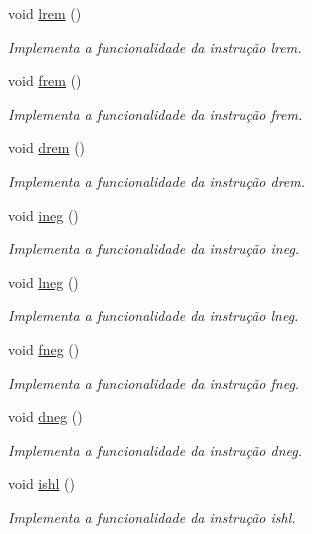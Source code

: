 \begin{DoxyCompactItemize}
void \hyperlink{classOperations_a437e4b34f2f1be8982d36f0cdf47f98c}{lrem} ()
\begin{DoxyCompactList}\small\item\em Implementa a funcionalidade da instrução lrem. \end{DoxyCompactList}\item 
void \hyperlink{classOperations_ad29eac4f222e4b74667086c3da0d5538}{frem} ()
\begin{DoxyCompactList}\small\item\em Implementa a funcionalidade da instrução frem. \end{DoxyCompactList}\item 
void \hyperlink{classOperations_abe333415749dbd2331ce89dc5e2233c5}{drem} ()
\begin{DoxyCompactList}\small\item\em Implementa a funcionalidade da instrução drem. \end{DoxyCompactList}\item 
void \hyperlink{classOperations_a819d5dd66c64a6801a1599b5abf81ae7}{ineg} ()
\begin{DoxyCompactList}\small\item\em Implementa a funcionalidade da instrução ineg. \end{DoxyCompactList}\item 
void \hyperlink{classOperations_a0a14cc7ee880b5d5f1c3b532e8e2117c}{lneg} ()
\begin{DoxyCompactList}\small\item\em Implementa a funcionalidade da instrução lneg. \end{DoxyCompactList}\item 
void \hyperlink{classOperations_a17a7d8f333373d30ae5b1595d96594e5}{fneg} ()
\begin{DoxyCompactList}\small\item\em Implementa a funcionalidade da instrução fneg. \end{DoxyCompactList}\item 
void \hyperlink{classOperations_a04f5d4f85b80f4c04216cd0259d3d7dc}{dneg} ()
\begin{DoxyCompactList}\small\item\em Implementa a funcionalidade da instrução dneg. \end{DoxyCompactList}\item 
void \hyperlink{classOperations_a3139bbe41519fb4761ecd7e2a8ddb994}{ishl} ()
\begin{DoxyCompactList}\small\item\em Implementa a funcionalidade da instrução ishl. \end{DoxyCompactList}\item 

\end{DoxyCompactItemize}
